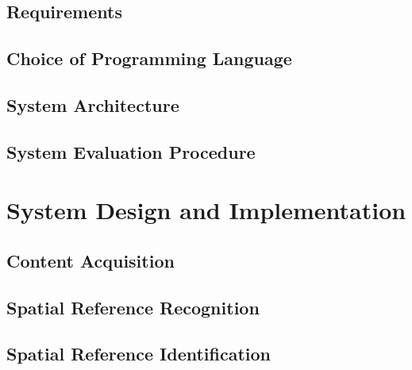 \documentclass[12pt, a4paper]{report}
\begin{document}
\section{Requirements}

\section{Choice of Programming Language}

\section{System Architecture}

\section{System Evaluation Procedure}


\chapter{System Design and Implementation}

\section{Content Acquisition}

\section{Spatial Reference Recognition}




\section{Spatial Reference Identification}
\end{document}
